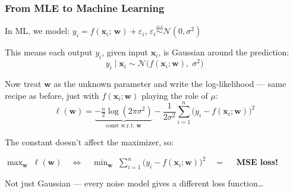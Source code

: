 \documentclass[aspectratio=169]{beamer}
\begin{document}
\begin{frame}
\frametitle{From MLE to Machine Learning}

\small
In ML, we model: \;$y_i = f(\mathbf{x}_i;\, \mathbf{w}) + \varepsilon_i$, \quad $\varepsilon_i \overset{\text{iid}}{\sim} \mathcal{N}(0, \sigma^2)$

\vspace{0.15cm}
This means each output $y_i$, given input $\mathbf{x}_i$, is Gaussian around the prediction:
$$y_i \mid \mathbf{x}_i \sim \mathcal{N}\!\bigl(f(\mathbf{x}_i;\mathbf{w}),\; \sigma^2\bigr)$$

\vspace{-0.3cm}\pause
Now treat $\mathbf{w}$ as the unknown parameter and write the log-likelihood --- same recipe as before, just with $f(\mathbf{x}_i;\mathbf{w})$ playing the role of $\mu$:
\vspace{-0.15cm}
$$\ell(\mathbf{w}) = \underbrace{-\tfrac{n}{2}\log(2\pi\sigma^2)}_{\text{const w.r.t.\ }\mathbf{w}} - \frac{1}{2\sigma^2}\sum_{i=1}^n\bigl(y_i - f(\mathbf{x}_i;\mathbf{w})\bigr)^2$$

\vspace{-0.2cm}\pause
The constant doesn't affect the maximizer, so:
\begin{center}
$\max_{\mathbf{w}} \;\ell(\mathbf{w}) \quad\Longleftrightarrow\quad \min_{\mathbf{w}} \;\displaystyle\sum_{i=1}^n\bigl(y_i - f(\mathbf{x}_i;\mathbf{w})\bigr)^2 \quad=\quad$ \textbf{MSE loss!}
\end{center}

\vspace{0.15cm}
\begin{center}
\end{center}

\vspace{0.1cm}
\centering\small Not just Gaussian --- every noise model gives a different loss function\ldots
\end{frame}
\end{document}
